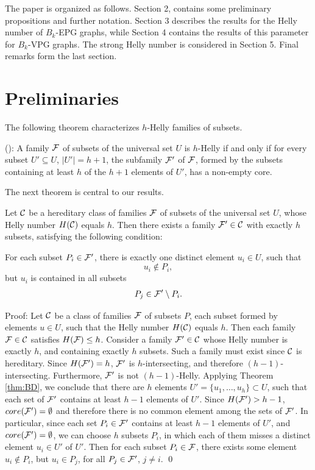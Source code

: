 The paper is organized as follows. Section 2, contains some preliminary propositions  and further notation. Section 3 describes  the results for the Helly number of $B_k$-EPG graphs, while Section 4 contains the results of this parameter for $B_k$-VPG graphs. The strong Helly number is considered in Section 5. Final remarks form the last section.

\section{Preliminaries}
The following theorem characterizes $h$-Helly families of subsets.


\begin{theorem}\label{thm:BD}(\cite{bergeDuchet1975}):
A family $\cal{F}$  of subsets of the universal set $U$ is $h$-Helly if and only if for every subset $U' \subseteq U$, $|U'|= h+1$, the subfamily $\cal{F'}$ of $\cal{F}$, formed by the subsets containing at least $h$ of the $h+1$ elements of $U'$, has a non-empty core. 
\end{theorem}

The next theorem is central to our results.

\begin{theorem}\label{thm:minimal}
Let ${\cal C}$ be a hereditary class of families ${\cal F}$ of subsets of the universal set $U$, whose Helly number $H({\cal C})$ equals $h$. Then there exists a family ${\cal F'} \in {\cal C}$ with exactly $h$ subsets, satisfying the following condition: 

For each subset $P_i \in \cal {F'}$, there is exactly one distinct element $u_i \in U$, such that \\
$$u_i \not \in P_i,$$ 
but $u_i$ is contained in all  subsets 
$$P_j \in {\cal F'} \setminus P_i.$$
\end{theorem}
 

Proof: 
Let ${\cal C}$ be a class of families ${\cal F}$ of subsets $P$, each subset formed by elements $u \in U$, such that the Helly number $H({\cal C})$ equals $h$. Then each family ${\cal F} \in {\cal C}$ satisfies $H({\cal F}) \leq h$. Consider a family ${\cal F'} \in {\cal C}$  whose Helly number is exactly $h$, and containing exactly $h$ subsets. Such a family must exist since ${\cal C}$ is hereditary. Since $H({\cal F'}) = h$, $\cal F'$ is $h$-intersecting, and therefore $(h-1)$-intersecting. Furthermore, ${\cal F'}$ is not $(h-1)$-Helly. Applying  Theorem \ref{thm:BD}, we conclude that there are $h$ elements $U' = \{u_1, \ldots, u_h\} \subset U$, such that each set of ${\cal F'}$ contains at least $h-1$ elements of $U'$. Since $H({\cal F'}) > h-1$, $core({\cal F'}) = \emptyset$ and therefore there is no common element among the sets of $\cal F'$. In particular, since each set $P_i \in {\cal F'}$ contains at least $h-1$ elements of $U'$, and $core(\cal F') = \emptyset$, we can choose $h$ subsets $P_i$, in which each of them misses a distinct element $u_i \in U'$ of $U'$. Then for each subset $P_i \in \cal F$, there exists some element $u_i \not \in P_i$, but $u_i \in P_j$, for all $P_j \in \cal F'$, $j \neq i$. \qed

